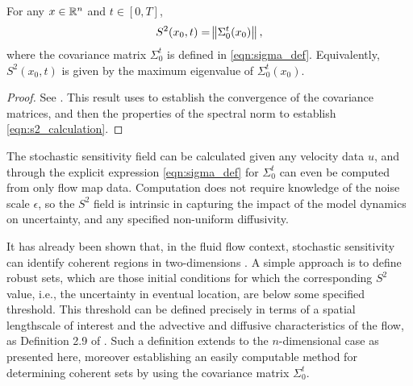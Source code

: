 \begin{theorem}[Computation of \(S^2\)]\label{thm:s2_calculation}
	For any \(x \in \mathbb{R}^n\) and \(t \in [0,T]\),
	\begin{equation}
		S^2\!\left(x_0,t\right) = \norm{\Sigma_0^t\!\left(x_0\right)},
		\label{eqn:s2_calculation}
	\end{equation}
	where the covariance matrix \(\Sigma_0^t\) is defined in \eqref{eqn:sigma_def}.
	Equivalently, \(S^2\!\left(x_0,t\right)\) is given by the maximum eigenvalue of \(\Sigma_0^t\!\left(x_0\right)\).
\end{theorem}
\begin{proof}
	See .
	This result uses  to establish the convergence of the covariance matrices, and then the properties of the spectral norm to establish \eqref{eqn:s2_calculation}.
\end{proof}
The stochastic sensitivity field can be calculated given any velocity data \(u\), and through the explicit expression \eqref{eqn:sigma_def} for \(\Sigma_0^t\) can even be computed from only flow map data.
Computation does not require knowledge of the noise scale \(\epsilon\), so the \(S^2\) field is intrinsic in capturing the impact of the model dynamics on uncertainty, and any specified non-uniform diffusivity.

It has already been shown that, in the fluid flow context, stochastic sensitivity can identify coherent regions in two-dimensions \cite{BadzaEtAl_2023_HowSensitiveAre, Balasuriya_2020_StochasticSensitivityComputable}.
A simple approach is to define robust sets, which are those initial conditions for which the corresponding \(S^2\) value, i.e., the uncertainty in eventual location,  are below some specified threshold.
This threshold can be defined precisely in terms of a spatial lengthscale of interest and the advective and diffusive characteristics of the flow, as Definition 2.9 of \cite{Balasuriya_2020_StochasticSensitivityComputable}.
Such a definition extends to the \(n\)-dimensional case as presented here, moreover establishing an easily computable method for determining coherent sets by using the covariance matrix \(\Sigma_0^t\).


